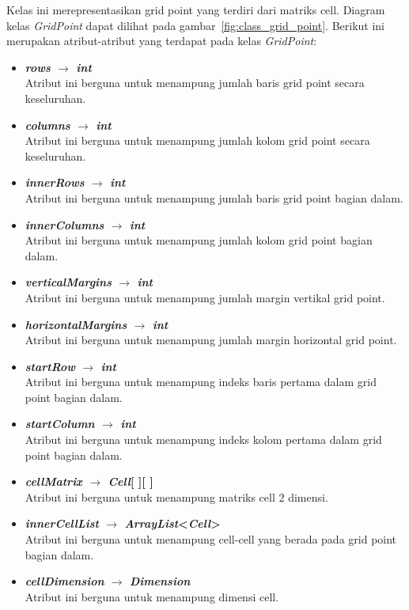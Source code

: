 Kelas ini merepresentasikan grid point yang terdiri dari matriks cell. Diagram kelas \textit{GridPoint} dapat dilihat pada gambar~\ref{fig:class_grid_point}. Berikut ini merupakan atribut-atribut yang terdapat pada kelas \textit{GridPoint}:
\begin{itemize}
	\item \textbf{\textit{rows} \(\rightarrow\) \textit{int}}\\
	Atribut ini berguna untuk menampung jumlah baris grid point secara keseluruhan.
	\item \textbf{\textit{columns} \(\rightarrow\) \textit{int}}\\
	Atribut ini berguna untuk menampung jumlah kolom grid point secara keseluruhan.
	\item \textbf{\textit{innerRows} \(\rightarrow\) \textit{int}}\\
	Atribut ini berguna untuk menampung jumlah baris grid point bagian dalam.
	\item \textbf{\textit{innerColumns} \(\rightarrow\) \textit{int}}\\
	Atribut ini berguna untuk menampung jumlah kolom grid point bagian dalam.
	\item \textbf{\textit{verticalMargins} \(\rightarrow\) \textit{int}}\\
	Atribut ini berguna untuk menampung jumlah margin vertikal grid point.
	\item \textbf{\textit{horizontalMargins} \(\rightarrow\) \textit{int}}\\
	Atribut ini berguna untuk menampung jumlah margin horizontal grid point.
	\item \textbf{\textit{startRow} \(\rightarrow\) \textit{int}}\\
	Atribut ini berguna untuk menampung indeks baris pertama dalam grid point bagian dalam.
	\item \textbf{\textit{startColumn} \(\rightarrow\) \textit{int}}\\
	Atribut ini berguna untuk menampung indeks kolom pertama dalam grid point bagian dalam.
	\item \textbf{\textit{cellMatrix} \(\rightarrow\) \textit{Cell}[ ][ ]}\\
	Atribut ini berguna untuk menampung matriks cell 2 dimensi.
	\item \textbf{\textit{innerCellList} \(\rightarrow\) \textit{ArrayList}<\textit{Cell}>}\\
	Atribut ini berguna untuk menampung cell-cell yang berada pada grid point bagian dalam.
	\item \textbf{\textit{cellDimension} \(\rightarrow\) \textit{Dimension}}\\
	Atribut ini berguna untuk menampung dimensi cell.
\end{itemize}

